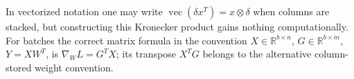In vectorized notation one may write \(\operatorname{vec}(\delta x^T)=x\otimes\delta\) when columns are stacked, but constructing this Kronecker product gains nothing computationally. For batches the correct matrix formula in the convention \(X\in\mathbb R^{b\times n}\), \(G\in\mathbb R^{b\times m}\), \(Y=XW^T\), is \(\nabla_WL=G^TX\); its transpose \(X^TG\) belongs to the alternative column-stored weight convention.
